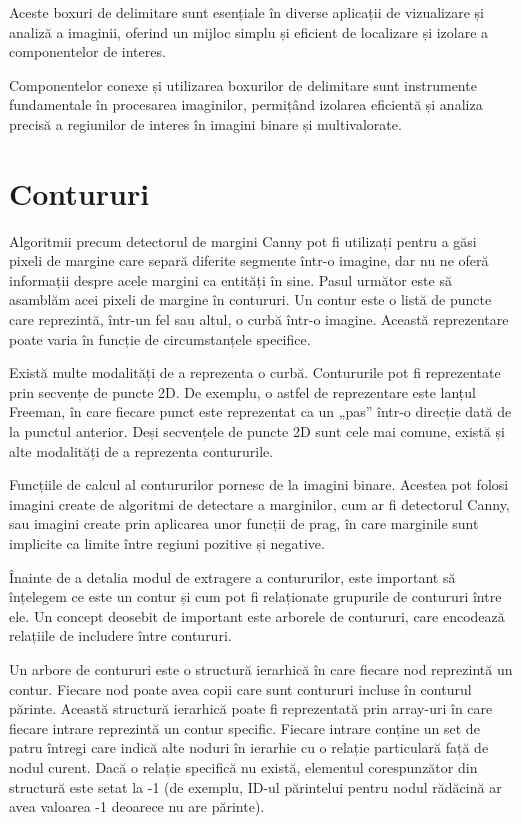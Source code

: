\documentclass[a4paper,12pt]{report}
\begin{document}
Aceste boxuri de delimitare sunt esențiale în diverse aplicații de vizualizare și analiză a imaginii, oferind un mijloc simplu și eficient de localizare și izolare a componentelor de interes.

Componentelor conexe și utilizarea boxurilor de delimitare sunt instrumente fundamentale în procesarea imaginilor, permițând izolarea eficientă și analiza precisă a regiunilor de interes în imagini binare și multivalorate.

\section{Contururi}
Algoritmii precum detectorul de margini Canny pot fi utilizați pentru a găsi pixeli de margine care separă diferite segmente într-o imagine, dar nu ne oferă informații despre acele margini ca entități în sine. Pasul următor este să asamblăm acei pixeli de margine în contururi. Un contur este o listă de puncte care reprezintă, într-un fel sau altul, o curbă într-o imagine. Această reprezentare poate varia în funcție de circumstanțele specifice.

Există multe modalități de a reprezenta o curbă. Contururile pot fi reprezentate prin secvențe de puncte 2D. De exemplu, o astfel de reprezentare este lanțul Freeman, în care fiecare punct este reprezentat ca un „pas” într-o direcție dată de la punctul anterior. Deși secvențele de puncte 2D sunt cele mai comune, există și alte modalități de a reprezenta contururile.

Funcțiile de calcul al contururilor pornesc de la imagini binare. Acestea pot folosi imagini create de algoritmi de detectare a marginilor, cum ar fi detectorul Canny, sau imagini create prin aplicarea unor funcții de prag, în care marginile sunt implicite ca limite între regiuni pozitive și negative.

Înainte de a detalia modul de extragere a contururilor, este important să înțelegem ce este un contur și cum pot fi relaționate grupurile de contururi între ele. Un concept deosebit de important este arborele de contururi, care encodează relațiile de includere între contururi.

Un arbore de contururi este o structură ierarhică în care fiecare nod reprezintă un contur. Fiecare nod poate avea copii care sunt contururi incluse în conturul părinte. Această structură ierarhică poate fi reprezentată prin array-uri în care fiecare intrare reprezintă un contur specific. Fiecare intrare conține un set de patru întregi care indică alte noduri în ierarhie cu o relație particulară față de nodul curent. Dacă o relație specifică nu există, elementul corespunzător din structură este setat la -1 (de exemplu, ID-ul părintelui pentru nodul rădăcină ar avea valoarea -1 deoarece nu are părinte).
\end{document}
